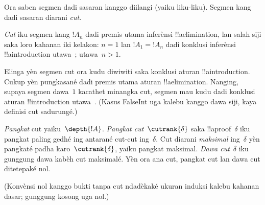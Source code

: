 \documentclass[../../../include/open-logic-section]{subfiles}
\begin{document}
Ora saben segmen dadi sasaran kanggo diilangi (yaiku liku-liku).
Segmen kang dadi sasaran diarani \emph{cut}.

\begin{defn}
\emph{Cut} iku segmen kang $!A_n$ dadi premis utama inferènsi
!!a{elimination}, lan salah siji saka loro kahanan iki kelakon:
$n=1$ lan $!A_1 = !A_n$ dadi konklusi inferènsi
!!a{introduction} utawa~\FalseInt; utawa~$n>1$.
\end{defn}

Elinga yèn segmen cut ora kudu diwiwiti saka konklusi aturan
!!a{introduction}. Cukup yèn pungkasané dadi premis utama
aturan !!a{elimination}. Nanging, supaya segmen dawa~$1$
kacathet minangka cut, segmen mau kudu dadi konklusi aturan
!!{introduction} utawa~\FalseInt.
(Kasus FalseInt uga kalebu kanggo dawa siji, kaya definisi cut sadurungé.)

\begin{defn}
\emph{Pangkat} cut yaiku~$\depth{!A}$. \emph{Pangkat
cut}~$\cutrank{\delta}$ saka !!a{proof}~$\delta$ iku pangkat
paling gedhé ing antarané cut-cut ing~$\delta$. Cut diarani
\emph{maksimal} ing~$\delta$ yèn pangkaté
padha karo~$\cutrank{\delta}$, yaiku pangkat maksimal.
\emph{Dawa cut}~$\delta$ iku gunggung dawa kabèh cut maksimalé.
Yèn ora ana cut, pangkat cut lan dawa cut ditetepaké nol.
\end{defn}
(Konvènsi nol kanggo bukti tanpa cut ndadèkaké ukuran induksi kalebu kahanan dasar; gunggung kosong uga nol.)
\end{document}

